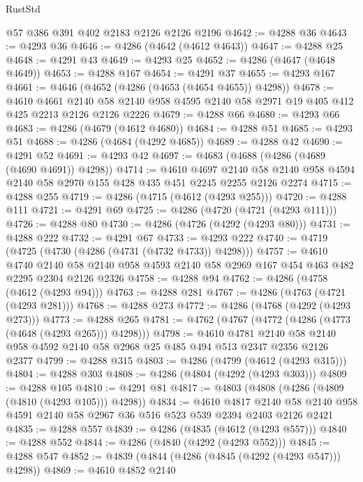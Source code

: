 \begin{lexlean}{RustStd}
\begin{coremodule}
    @57
    @386
    @391
    @402
    @2183
    @2126
    @2126
    @2196
@4642 := @4288 @36
@4643 := @4293 @36
@4646 := @4286 (@4642 (@4612 @4643))
@4647 := @4288 @25
@4648 := @4291 @43
@4649 := @4293 @25
@4652 := @4286 (@4647 (@4648 @4649))
@4653 := @4288 @167
@4654 := @4291 @37
@4655 := @4293 @167
@4661 := @4646 (@4652 (@4286 (@4653 (@4654 @4655)) @4298))
@4678 := @4610
    @4661
    @2140
    @58
    @2140
    @958
    @4595
    @2140
    @58
    @2971
    @19
    @405
    @412
    @425
    @2213
    @2126
    @2126
    @2226
@4679 := @4288 @66
@4680 := @4293 @66
@4683 := @4286 (@4679 (@4612 @4680))
@4684 := @4288 @51
@4685 := @4293 @51
@4688 := @4286 (@4684 (@4292 @4685))
@4689 := @4288 @42
@4690 := @4291 @52
@4691 := @4293 @42
@4697 := @4683 (@4688 (@4286 (@4689 (@4690 @4691)) @4298))
@4714 := @4610
    @4697
    @2140
    @58
    @2140
    @958
    @4594
    @2140
    @58
    @2970
    @155
    @428
    @435
    @451
    @2245
    @2255
    @2126
    @2274
@4715 := @4288 @255
@4719 := @4286 (@4715 (@4612 (@4293 @255)))
@4720 := @4288 @111
@4721 := @4291 @69
@4725 := @4286 (@4720 (@4721 (@4293 @111)))
@4726 := @4288 @80
@4730 := @4286 (@4726 (@4292 (@4293 @80)))
@4731 := @4288 @222
@4732 := @4291 @67
@4733 := @4293 @222
@4740 := @4719 (@4725 (@4730 (@4286 (@4731 (@4732 @4733)) @4298)))
@4757 := @4610
    @4740
    @2140
    @58
    @2140
    @958
    @4593
    @2140
    @58
    @2969
    @167
    @454
    @463
    @482
    @2295
    @2304
    @2126
    @2326
@4758 := @4288 @94
@4762 := @4286 (@4758 (@4612 (@4293 @94)))
@4763 := @4288 @281
@4767 := @4286 (@4763 (@4721 (@4293 @281)))
@4768 := @4288 @273
@4772 := @4286 (@4768 (@4292 (@4293 @273)))
@4773 := @4288 @265
@4781 := @4762 (@4767 (@4772 (@4286 (@4773 (@4648 (@4293 @265))) @4298)))
@4798 := @4610
    @4781
    @2140
    @58
    @2140
    @958
    @4592
    @2140
    @58
    @2968
    @25
    @485
    @494
    @513
    @2347
    @2356
    @2126
    @2377
@4799 := @4288 @315
@4803 := @4286 (@4799 (@4612 (@4293 @315)))
@4804 := @4288 @303
@4808 := @4286 (@4804 (@4292 (@4293 @303)))
@4809 := @4288 @105
@4810 := @4291 @81
@4817 := @4803 (@4808 (@4286 (@4809 (@4810 (@4293 @105))) @4298))
@4834 := @4610
    @4817
    @2140
    @58
    @2140
    @958
    @4591
    @2140
    @58
    @2967
    @36
    @516
    @523
    @539
    @2394
    @2403
    @2126
    @2421
@4835 := @4288 @557
@4839 := @4286 (@4835 (@4612 (@4293 @557)))
@4840 := @4288 @552
@4844 := @4286 (@4840 (@4292 (@4293 @552)))
@4845 := @4288 @547
@4852 := @4839 (@4844 (@4286 (@4845 (@4292 (@4293 @547))) @4298))
@4869 := @4610
    @4852
    @2140

\end{coremodule}
\end{lexlean}
